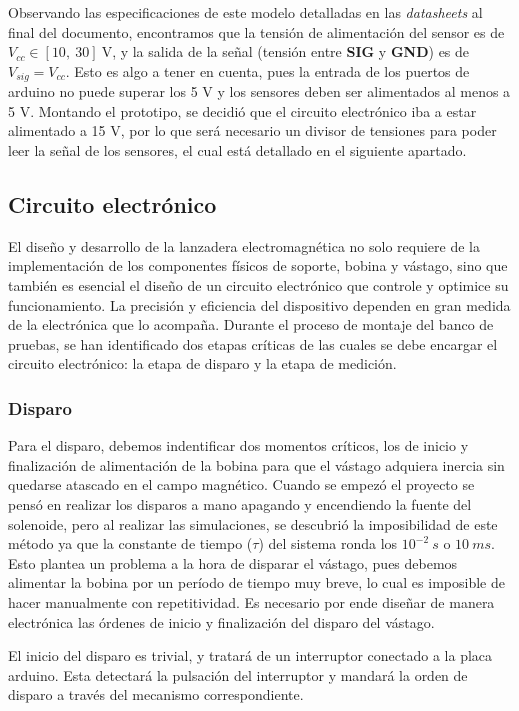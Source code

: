 Observando las especificaciones de este modelo detalladas en las \textit{datasheets} al final del documento, encontramos que la tensión de alimentación del sensor es de \(V_{cc}\in [10,~30]~\text{V}\), y la salida de la señal (tensión entre \textbf{SIG} y \textbf{GND}) es de \(V_{sig}=V_{cc}\). Esto es algo a tener en cuenta, pues la entrada de los puertos de arduino no puede superar los 5 V y los sensores deben ser alimentados al menos a 5 V. Montando el prototipo, se decidió que el circuito electrónico iba a estar alimentado a 15 V, por lo que será necesario un divisor de tensiones para poder leer la señal de los sensores, el cual está detallado en el siguiente apartado.

\subsection{Circuito electrónico}
\label{subsec:circuito}
El diseño y desarrollo de la lanzadera electromagnética no solo requiere de la implementación de los componentes físicos de soporte, bobina y vástago, sino que también es esencial el diseño de un circuito electrónico que controle y optimice su funcionamiento. La precisión y eficiencia del dispositivo dependen en gran medida de la electrónica que lo acompaña. Durante el proceso de montaje del banco de pruebas, se han identificado dos etapas críticas de las cuales se debe encargar el circuito electrónico: la etapa de disparo y la etapa de medición.

\subsubsection*{Disparo}

Para el disparo, debemos indentificar dos momentos críticos, los de inicio y finalización de alimentación de la bobina para que el vástago adquiera inercia sin quedarse atascado en el campo magnético. Cuando se empezó el proyecto se pensó en realizar los disparos a mano apagando y encendiendo la fuente del solenoide, pero al realizar las simulaciones, se descubrió la imposibilidad de este método ya que la constante de tiempo (\(\tau\)) del sistema ronda los \(10^{-2}~s\) o \(10~ms\). Esto plantea un problema a la hora de disparar el vástago, pues debemos alimentar la bobina por un período de tiempo muy breve, lo cual es imposible de hacer manualmente con repetitividad. Es necesario por ende diseñar de manera electrónica las órdenes de inicio y finalización del disparo del vástago.

El inicio del disparo es trivial, y tratará de un interruptor conectado a la placa arduino. Esta detectará la pulsación del interruptor y mandará la orden de disparo a través del mecanismo correspondiente.

